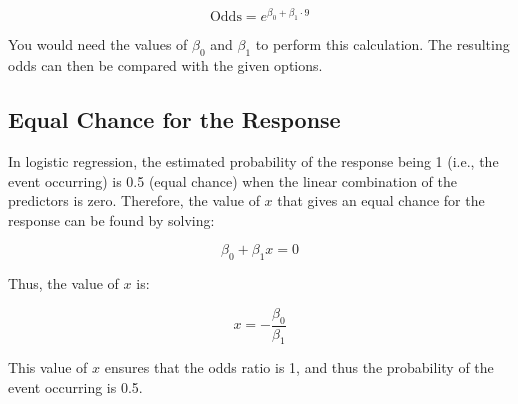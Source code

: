 \documentclass{article}
\begin{document}
\[
\text{Odds} = e^{\beta_0 + \beta_1 \cdot 9}
\]

You would need the values of \( \beta_0 \) and \( \beta_1 \) to perform this calculation. The resulting odds can then be compared with the given options.

\subsection{Equal Chance for the Response}

In logistic regression, the estimated probability of the response being 1 (i.e., the event occurring) is 0.5 (equal chance) when the linear combination of the predictors is zero. Therefore, the value of \( x \) that gives an equal chance for the response can be found by solving:

\[
\beta_0 + \beta_1 x = 0
\]

Thus, the value of \( x \) is:

\[
x = -\frac{\beta_0}{\beta_1}
\]

This value of \( x \) ensures that the odds ratio is 1, and thus the probability of the event occurring is 0.5.
\end{document}
